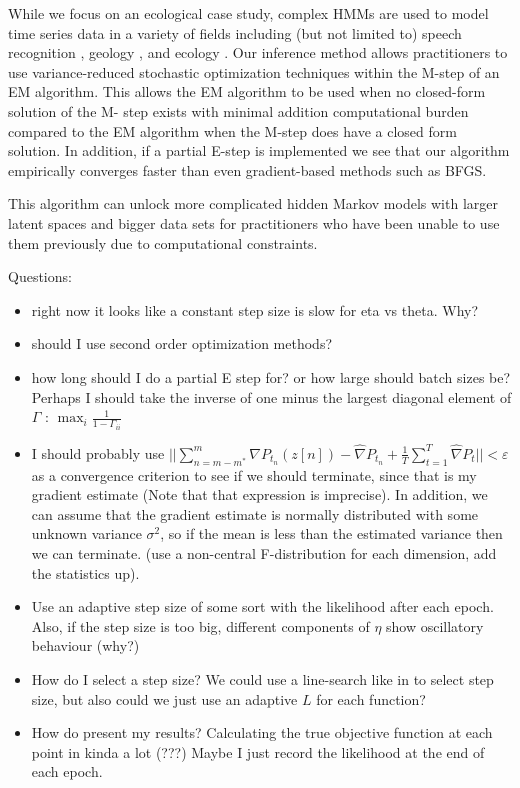 While we focus on an ecological case study, complex HMMs are used to model time series data in a variety of fields including (but not limited to) speech recognition \citep{Gales:2008}, geology \citep{Bebbington:2007}, and ecology \citep{McClintock:2020}. Our inference method allows practitioners to use variance-reduced stochastic optimization techniques within the M-step of an EM algorithm. This allows the EM algorithm to be used when no closed-form solution of the M- step exists with minimal addition computational burden compared to the EM algorithm when the M-step does have a closed form solution. In addition, if a partial E-step is implemented we see that our algorithm empirically converges faster than even gradient-based methods such as BFGS.

This algorithm can unlock more complicated hidden Markov models with larger latent spaces and bigger data sets for practitioners who have been unable to use them previously due to computational constraints.

\iffalse

Questions:

\begin{itemize}
    \item right now it looks like a constant step size is slow for eta vs theta. Why?
    \item should I use second order optimization methods?
    \item how long should I do a partial E step for? or how large should batch sizes be? Perhaps I should take the inverse of one minus the largest diagonal element of $\Gamma$ : $\max_i \frac{1}{1-\Gamma_{ii}}$
    \item I should probably use $||\sum_{n=m-m^*}^{m} \nabla P_{t_n}(z[n]) - \widehat \nabla P_{t_n} + \frac{1}{T} \sum_{t=1}^T \widehat \nabla P_t|| < \varepsilon$ as a convergence criterion to see if we should terminate, since that is my gradient estimate (Note that that expression is imprecise). In addition, we can assume that the gradient estimate is normally distributed with some unknown variance $\sigma^2$, so if the mean is less than the estimated variance then we can terminate. (use a non-central F-distribution for each dimension, add the statistics up).
    \item Use an adaptive step size of some sort with the likelihood after each epoch. Also, if the step size is too big, different components of $\eta$ show oscillatory behaviour (why?)
    \item How do I select a step size? We could use a line-search like in \citep{Schmidt:2017} to select step size, but also could we just use an adaptive $L$ for each function?  
    \item How do present my results? Calculating the true objective function at each point in kinda a lot (???) Maybe I just record the likelihood at the end of each epoch.
\end{itemize}

